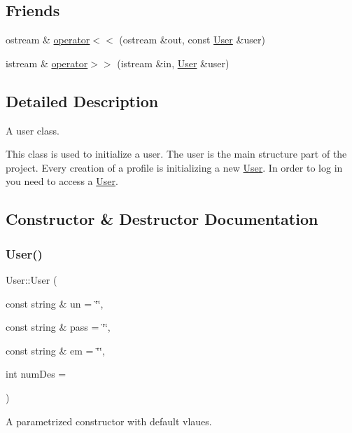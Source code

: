 \subsection*{Friends}
\begin{DoxyCompactItemize}
\item 
ostream \& \hyperlink{class_user_acf1038a8d320684dc3fbdd5e4308e062}{operator$<$$<$} (ostream \&out, const \hyperlink{class_user}{User} \&user)
\item 
istream \& \hyperlink{class_user_aae624f64cdd1af3b59c2443cffa82494}{operator$>$$>$} (istream \&in, \hyperlink{class_user}{User} \&user)
\end{DoxyCompactItemize}


\subsection{Detailed Description}
A user class. 

This class is used to initialize a user. The user is the main structure part of the project. Every creation of a profile is initializing a new \hyperlink{class_user}{User}. In order to log in you need to access a \hyperlink{class_user}{User}. 

\subsection{Constructor \& Destructor Documentation}
\mbox{\label{class_user_acefd113882ab5f80ea087401b7f9d0b4}} 
\subsubsection{\texorpdfstring{User()}{User()}\hspace{0.1cm}{\footnotesize\ttfamily [1/2]}}
{\footnotesize\ttfamily User\+::\+User (\begin{DoxyParamCaption}\item[{const string \&}]{un = {\ttfamily \char`\"{}\char`\"{}},  }\item[{const string \&}]{pass = {\ttfamily \char`\"{}\char`\"{}},  }\item[{const string \&}]{em = {\ttfamily \char`\"{}\char`\"{}},  }\item[{int}]{num\+Des = {} }\end{DoxyParamCaption})}

A parametrized constructor with default vlaues. \mbox{\label{class_user_aad23b10cdefd26d6ca2ca981e9f9c973}} 
